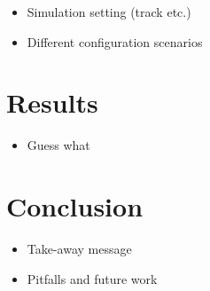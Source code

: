 \documentclass[a4paper, twocolumn, 11pt, twoside]{article}
\begin{document}
\begin{itemize}
    \item Simulation setting (track etc.)
    \item Different configuration scenarios
\end{itemize}

\section{Results}

\begin{itemize}
    \item Guess what
\end{itemize}

\section{Conclusion}

\begin{itemize}
    \item Take-away message
    \item Pitfalls and future work
\end{itemize}



\end{document}
